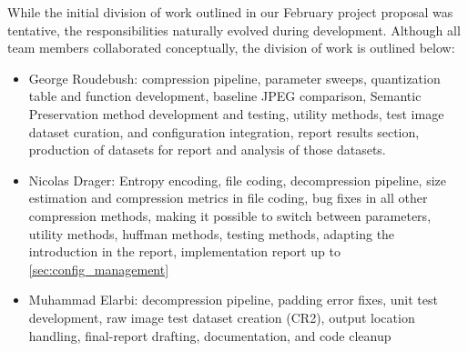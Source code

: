 While the initial division of work outlined in our February project proposal was tentative, the responsibilities naturally evolved during development. Although all team members collaborated conceptually, the division of work is outlined below:
\begin{itemize}
  \item George Roudebush: compression pipeline, parameter sweeps, quantization table and function development, baseline JPEG comparison, Semantic Preservation method development and testing, utility methods, test image dataset curation, and configuration integration, report results section, production of datasets for report and analysis of those datasets.
  \item Nicolas Drager: Entropy encoding, file coding, decompression pipeline, size estimation and compression metrics in file coding, bug fixes in all other compression methods, making it possible to switch between parameters, utility methods, huffman methods, testing methods, adapting the introduction in the report, implementation report up to \ref{sec:config_management}
  \item Muhammad Elarbi: decompression pipeline, padding error fixes, unit test development, raw image test dataset creation (CR2), output location handling, final-report drafting, documentation, and code cleanup
\end{itemize}